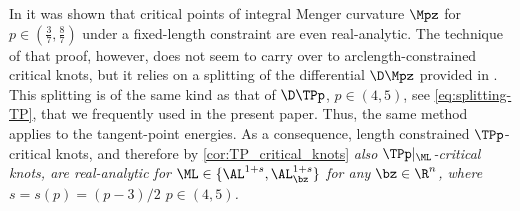 \begin{remark}
    In \cite[Corollary 1.3]{steenebruegge-vorderobermeier_2022} it was shown that critical points of integral Menger curvature $ \Mpz $ for $ p\in( \tfrac{3}{7},\tfrac{8}{7} ) $ under a fixed-length constraint are even real-analytic. The technique of that proof, however, does not seem to carry over to arclength-constrained critical knots, but it relies on a splitting of the differential $ \D\Mpz $ provided in \cite[Section 4]{blatt-reiter_2015b}. This splitting is of the same kind as that of $ \D\TPp $, $ p\in(4,5) $, see \cref{eq:splitting-TP}, that we frequently used in the present paper. Thus, the same method applies to the tangent-point energies. As a consequence, length constrained $ \TPp $-critical knots, and therefore by \cref{cor:TP_critical_knots} \textit{also $ \TPp|_{\ML} $-critical knots, are real-analytic for $ \ML\in \{\AL^{1+s},\AL^{1+s}_{\bz}\} $ for any $ \bz\in \R^n $, where $ s=s(p)={(p-3)}/{2} $ $ p\in(4,5) $. }
\end{remark}

